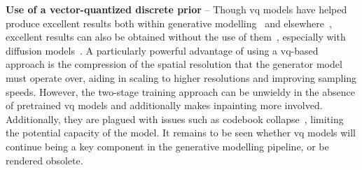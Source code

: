 \textbf{Use of a vector-quantized discrete prior} -- 
Though \gls{vq} models have helped produce excellent results both within
generative
modelling~\cite{razavi2019generating,esser2021taming,bondtaylor2021unleashing,rombach2021highresolution,ramesh2021dalle,yu2021vqgan,lee2022rqvae}
and elsewhere~\cite{zeghidour2021soundstream}, excellent results can also be
obtained without the use of
them~\cite{child2020vqvae,arash2020nvae,hazami2022efficient}, especially with
diffusion
models~\cite{song2019sbm,song2020sde,dhariwal2021ddpm,song2021mlt,xiao2021trilemma,vahdat2021sbmlatent,martineau2021fast,dockhorn2021langevin}.
A particularly powerful advantage of using a \gls{vq}-based approach is the
compression of the spatial resolution that the generator model must operate
over, aiding in scaling to higher resolutions and improving sampling speeds.
However, the two-stage training approach can be unwieldy in the absence of
pretrained \gls{vq} models and additionally makes inpainting more involved.
Additionally, they are plagued with issues such as codebook
collapse~\cite{esser2021taming,bondtaylor2021unleashing,yu2021vqgan}, limiting
the potential capacity of the model. It remains to be seen whether \gls{vq}
models will continue being a key component in the generative modelling pipeline,
or be rendered obsolete.

